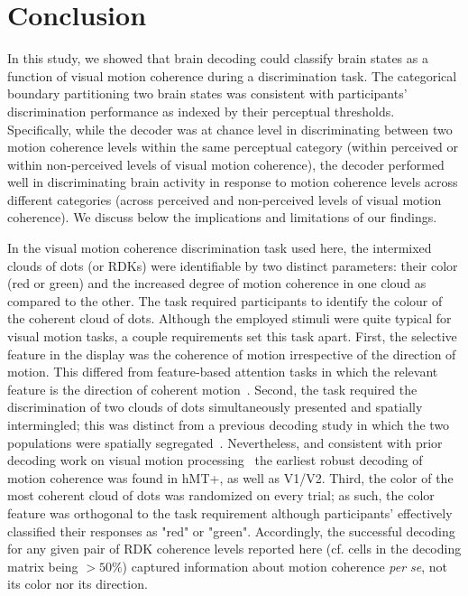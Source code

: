 \section{Conclusion}
In this study, we showed that brain decoding could classify brain states as a function of visual motion coherence during a discrimination task. The categorical boundary partitioning two brain states was consistent with participants' discrimination performance as indexed by their perceptual thresholds. Specifically, while the decoder was at chance level in discriminating between two motion coherence levels within the same perceptual category (within perceived or within non-perceived levels of visual motion coherence), the decoder performed well in discriminating brain activity in response to motion coherence levels across different categories (across perceived and non-perceived levels of visual motion coherence). We discuss below the implications and limitations of our findings.

In the visual motion coherence discrimination task used here, the intermixed clouds of dots (or RDKs) were identifiable by two distinct parameters: their color (red or green) and the increased degree of motion coherence in one cloud as compared to the other. The task required participants to identify the colour of the coherent cloud of dots. Although the employed stimuli were quite typical for visual motion tasks, a couple requirements set this task apart. First, the selective feature in the display was the coherence of motion irrespective of the direction of motion. This differed from feature-based attention tasks in which the relevant feature is the direction of coherent motion~\cite{31treue1999feature,32saproo2014attention}. Second, the task required the discrimination of two clouds of dots simultaneously presented and spatially intermingled; this was distinct from a previous decoding study in which the two populations were spatially segregated~\cite{14serences2007representation}. Nevertheless, and consistent with prior decoding work on visual motion processing~\cite{5kamitani2005decoding,13kamitani2006decoding,14serences2007representation,15hogendoorn2013decoding,16van2014decoding} the earliest robust decoding of motion coherence was found in hMT+, as well as V1/V2. Third, the color of the most coherent cloud of dots was randomized on every trial; as such, the color feature was orthogonal to the task requirement although participants' effectively classified their responses as "red" or "green". Accordingly, the successful decoding for any given pair of RDK coherence levels reported here (cf. cells in the decoding matrix being $>50\%$) captured information about motion coherence \textit{per se}, not its color nor its direction.

